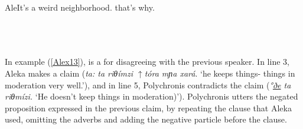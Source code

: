 \documentclass[output=paper]{LSP/langsci}
\begin{document}
\begin{Transcript}[FS {>}{>\hspace{0.1in}}]{Ale}{It’s a weird neighborhood. that’s why.}%
\label{Alex12}%
\\
 \\   
\\ 
\\ 
\end{Transcript}

In example (\ref{Alex13}),  is a  for disagreeing with the previous speaker. In line 3, Aleka makes a claim (\textit{ta: ta riθímzi $\uparrow$tóra mɲa xará}. `he keeps things- things in moderation very well.'), and in line 5, Polychronis contradicts the claim (\textit{°\underline{ðe} ta riθmízi.} `He doesn’t keep things in moderation)'). Polychronis utters the negated proposition expressed in the previous claim, by repeating the clause that Aleka used, omitting the adverbs and adding the negative particle before the clause.
\end{document}
